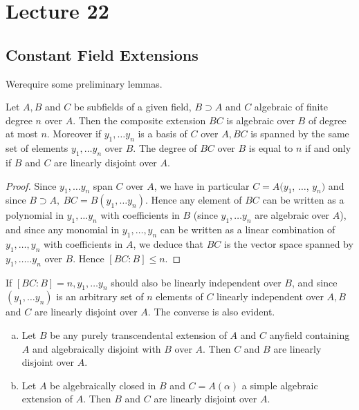 \chapter{Lecture 22}\label{chap22}

\setcounter{section}{36}
\section{Constant Field Extensions}\label{chap22:sec37}%

We\pageoriginale require some preliminary lemmas.
\setcounter{Lemma}{0}
\begin{Lemma}\label{chap22:sec37:lem1}%
  Let $A, B$ and $C$ be subfields of a given field, $B \supset A$ and
  $C$ algebraic of finite degree $n$ over  $A$. Then the composite
  extension $BC$ is algebraic over $B$ of degree at most $n$. Moreover
  if $y_1, \ldots y_n$ is a basis of $C$ over $A, BC$ is spanned by
  the same set of elements $y_1 , \ldots y_n$ over $B$. The degree of
  $BC$ over $B$ is equal to $n$ if and only if $B$ and $C$ are
  linearly disjoint over $A$. 
\end{Lemma}

\begin{proof}
  Since $y_1, \ldots  y_n$ span $C$ over $A$, we have in particular $C
  = A(y_1$, $\ldots$, $y_n)$ and since $B \supset A, ~ BC = B(y_1, \ldots
  y_n)$. Hence any element of $BC$ can be written as a polynomial in
  $y_1 , \ldots y_n$ with coefficients in $B$ (since $y_1 , \ldots
  y_n$ are algebraic over $A$),  and since any monomial in $y_1 ,
  \ldots , y_n$ can be written as a linear combination of $y_1 ,
  \ldots , y_n$ with coefficients in $A$, we deduce that $BC$ is the
  vector space spanned by $y_1, \ldots .. y_n$ over $B$. Hence $[ BC :
    B ] \le n$. 
\end{proof}

If $[BC : B] = n, y_1 , \ldots y_n$ should also be linearly
independent over $B$, and since $(y_1, \ldots y_n)$ is an arbitrary
set of $n$ elements of $C$ linearly independent over $A, B$ and $C$
are linearly disjoint over $A$. The converse is also evident. 

\begin{Lemma}\label{chap22:sec37:lem2}%
  \begin{enumerate}[(a)]
  \item Let $B$ be any purely transcendental extension of $A$ and $C $
    any\pageoriginale field containing $A$ and algebraically disjoint
    with $B$ over 
    $A$. Then $C$ and $B$ are linearly disjoint over $A$. 
  \item Let $A$ be algebraically closed in $B$ and $C = A (\alpha)$ a
    simple algebraic extension of $A$. Then $B$ and $C$ are linearly
    disjoint over $A$. 
  \end{enumerate}
\end{Lemma}

